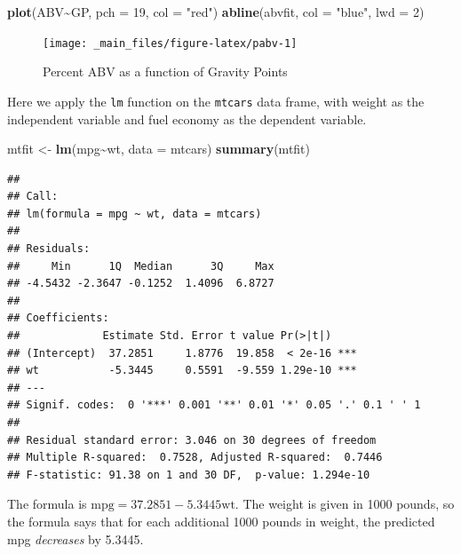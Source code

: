 \documentclass[
]{book}
\newenvironment{Shaded}{\begin{snugshade}}{\end{snugshade}}
\newcommand{\AttributeTok}[1]{\textcolor[rgb]{0.13,0.29,0.53}{#1}}
\newcommand{\DecValTok}[1]{\textcolor[rgb]{0.00,0.00,0.81}{#1}}
\newcommand{\FunctionTok}[1]{\textcolor[rgb]{0.13,0.29,0.53}{\textbf{#1}}}
\newcommand{\NormalTok}[1]{#1}
\newcommand{\OtherTok}[1]{\textcolor[rgb]{0.56,0.35,0.01}{#1}}
\newcommand{\SpecialCharTok}[1]{\textcolor[rgb]{0.81,0.36,0.00}{\textbf{#1}}}
\newcommand{\StringTok}[1]{\textcolor[rgb]{0.31,0.60,0.02}{#1}}
\theoremstyle{definition}
\theoremstyle{definition}
\theoremstyle{definition}
\theoremstyle{definition}
\theoremstyle{remark}
\begin{document}
\begin{Shaded}
\begin{Highlighting}[]
\FunctionTok{plot}\NormalTok{(ABV}\SpecialCharTok{\textasciitilde{}}\NormalTok{GP, }\AttributeTok{pch =} \DecValTok{19}\NormalTok{, }\AttributeTok{col =} \StringTok{"red"}\NormalTok{)}
\FunctionTok{abline}\NormalTok{(abvfit, }\AttributeTok{col =} \StringTok{"blue"}\NormalTok{, }\AttributeTok{lwd =} \DecValTok{2}\NormalTok{)}
\end{Highlighting}
\end{Shaded}

\begin{figure}

{\centering \texttt{[image: \_main\_files/figure-latex/pabv-1]} 

}

\caption{Percent ABV as a function of Gravity Points}\label{fig:pabv}
\end{figure}

Here we apply the \texttt{lm} function on the \texttt{mtcars} data frame, with weight as the independent variable and fuel economy as the dependent variable.

\begin{Shaded}
\begin{Highlighting}[]
\NormalTok{mtfit }\OtherTok{\textless{}{-}} \FunctionTok{lm}\NormalTok{(mpg}\SpecialCharTok{\textasciitilde{}}\NormalTok{wt, }\AttributeTok{data =}\NormalTok{ mtcars)}
\FunctionTok{summary}\NormalTok{(mtfit)}
\end{Highlighting}
\end{Shaded}

\begin{verbatim}
## 
## Call:
## lm(formula = mpg ~ wt, data = mtcars)
## 
## Residuals:
##     Min      1Q  Median      3Q     Max 
## -4.5432 -2.3647 -0.1252  1.4096  6.8727 
## 
## Coefficients:
##             Estimate Std. Error t value Pr(>|t|)    
## (Intercept)  37.2851     1.8776  19.858  < 2e-16 ***
## wt           -5.3445     0.5591  -9.559 1.29e-10 ***
## ---
## Signif. codes:  0 '***' 0.001 '**' 0.01 '*' 0.05 '.' 0.1 ' ' 1
## 
## Residual standard error: 3.046 on 30 degrees of freedom
## Multiple R-squared:  0.7528, Adjusted R-squared:  0.7446 
## F-statistic: 91.38 on 1 and 30 DF,  p-value: 1.294e-10
\end{verbatim}

The formula is \(\text{mpg}=37.2851-5.3445\text{wt}.\) The weight is given in 1000 pounds, so the formula says that for each additional 1000 pounds in weight, the predicted mpg \emph{decreases} by 5.3445.
\end{document}
